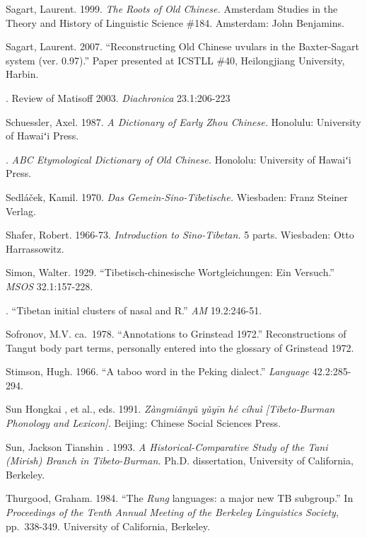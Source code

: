 Sagart, Laurent.
1999.
\textit{The Roots of Old Chinese.}
Amsterdam Studies in the Theory and History of Linguistic Science \#184. Amsterdam: John Benjamins.

Sagart, Laurent.
2007.
“Reconstructing Old Chinese uvulars in the Baxter-Sagart system (ver. 0.97).”
Paper presented at ICSTLL \#40, Heilongjiang University, Harbin.

.
Review of Matisoff 2003.
\textit{Diachronica} 23.1:206-223

Schuessler, Axel.
1987.
\textit{A Dictionary of Early Zhou Chinese.}
Honolulu: University of Hawaiʻi Press.

.
\textit{ABC Etymological Dictionary of Old Chinese.}
Honololu: University of Hawaiʻi Press.

Sedláček, Kamil.
1970.
\textit{Das Gemein-Sino-Tibetische.}
Wiesbaden: Franz Steiner Verlag.

Shafer, Robert.
1966-73.
\textit{Introduction to Sino-Tibetan.}
5 parts.  Wiesbaden: Otto Harrassowitz.

Simon, Walter.
1929.
“Tibetisch-chinesische Wortgleichungen: Ein Versuch.”
\textit{MSOS} 32.1:157-228.

.
“Tibetan initial clusters of nasal and R.”
\textit{AM} 19.2:246-51.

Sofronov, M.V.
ca.~1978.
“Annotations to Grinstead 1972.”
Reconstructions of Tangut body part terms, personally entered into the glossary of Grinstead 1972. %

Stimson, Hugh.
1966.
“A taboo word in the Peking dialect.”
\textit{Language} 42.2:285-294.

Sun Hongkai , et al., eds.
1991.
 \textit{Zàngmiǎnyǔ yǔyīn hé cíhuì [Tibeto-Burman Phonology and Lexicon].}
Beijing: Chinese Social Sciences Press.

Sun, Jackson Tianshin .
1993.
\textit{A Historical-Comparative Study of the Tani (Mirish) Branch in Tibeto-Burman.}
Ph.D. dissertation, University of California, Berkeley.

Thurgood, Graham.
1984.
“The \textit{Rung} languages: a major new TB subgroup.”
In \textit{Proceedings of the Tenth Annual Meeting of the Berkeley Linguistics Society}, pp.\ 338-349. University of California, Berkeley.

